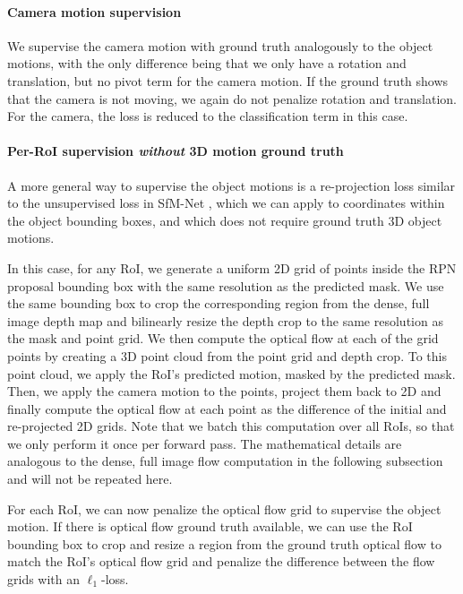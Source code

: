 \paragraph{Camera motion supervision}
We supervise the camera motion with ground truth analogously to the
object motions, with the only difference being that we only have
a rotation and translation, but no pivot term for the camera motion.
If the ground truth shows that the camera is not moving, we again do not
penalize rotation and translation. For the camera, the loss is reduced to the
classification term in this case.

\paragraph{Per-RoI supervision \emph{without} 3D motion ground truth}
A more general way to supervise the object motions is a re-projection
loss similar to the unsupervised loss in SfM-Net \cite{SfmNet},
which we can apply to coordinates within the object bounding boxes,
and which does not require ground truth 3D object motions.

In this case, for any RoI, we generate a uniform 2D grid of points inside the RPN proposal bounding box
with the same resolution as the predicted mask. We use the same bounding box
to crop the corresponding region from the dense, full image depth map
and bilinearly resize the depth crop to the same resolution as the mask and point
grid.
We then compute the optical flow at each of the grid points by creating
a 3D point cloud from the point grid and depth crop. To this point cloud, we
apply the RoI's predicted motion, masked by the predicted mask.
Then, we apply the camera motion to the points, project them back to 2D
and finally compute the optical flow at each point as the difference of the initial and re-projected 2D grids.
Note that we batch this computation over all RoIs, so that we only perform
it once per forward pass. The mathematical details are analogous to the
dense, full image flow computation in the following subsection and will not
be repeated here. 

For each RoI, we can now penalize the optical flow grid to supervise the object motion.
If there is optical flow ground truth available, we can use the RoI bounding box to
crop and resize a region from the ground truth optical flow to match the RoI's
optical flow grid and penalize the difference between the flow grids with an $\ell_1$-loss.

